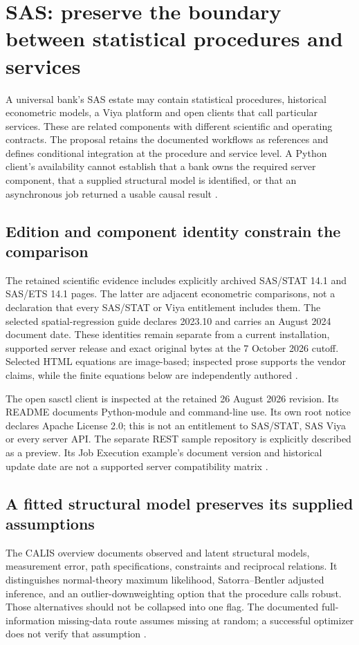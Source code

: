\section{SAS: preserve the boundary between statistical procedures and services}
\label{sec:exec24-sas-reuse}

A universal bank's SAS estate may contain statistical procedures, historical
econometric models, a Viya platform and open clients that call particular
services. These are related components with different scientific and operating
contracts. The proposal retains the documented workflows as references and
defines conditional integration at the procedure and service level. A Python
client's availability cannot establish that a bank owns the required server
component, that a supplied structural model is identified, or that an
asynchronous job returned a usable causal result
\cite{exec13_latent_sas_calis,exec23_workflow_sasctl,
exec23_workflow_delegates_sasctl,exec24_sas_choice}.

\subsection{Edition and component identity constrain the comparison}
The retained scientific evidence includes explicitly archived SAS/STAT 14.1
and SAS/ETS 14.1 pages. The latter are adjacent econometric comparisons,
not a declaration that every SAS/STAT or Viya entitlement includes them.
The selected spatial-regression guide declares 2023.10 and carries an
August 2024 document date. These identities remain separate from a current
installation, supported server release and exact original bytes at the
7 October 2026 cutoff. Selected HTML equations are image-based; inspected
prose supports the vendor claims, while the finite equations below are
independently authored
\cite{exec13_ct_sas_causal,exec13_ivrd_sas,
exec20_network_sas_latest_spatial,exec24_sas_choice}.

The open sasctl client is inspected at the retained 26 August 2026 revision.
Its README documents Python-module and command-line use. Its own root notice
declares Apache License 2.0; this is not an entitlement to SAS/STAT, SAS Viya
or every server API. The separate REST sample repository is explicitly
described as a preview. Its Job Execution example's document version and
historical update date are not a supported server compatibility matrix
\cite{exec23_workflow_sasctl,exec24_workflow_contracts_sas}.

\subsection{A fitted structural model preserves its supplied assumptions}
The CALIS overview documents observed and latent structural models,
measurement error, path specifications, constraints and reciprocal relations.
It distinguishes normal-theory maximum likelihood, Satorra--Bentler adjusted
inference, and an outlier-downweighting option that the procedure calls
robust. Those alternatives should not be collapsed into one flag. The
documented full-information missing-data route assumes missing at random;
a successful optimizer does not verify that assumption
\cite{exec13_latent_sas_calis}.


